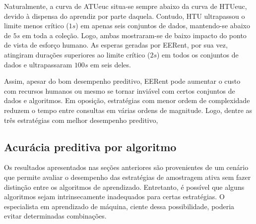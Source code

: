 Naturalmente, a curva de ATUeuc situa-se sempre abaixo da curva de HTUeuc, devido à dispensa do aprendiz por parte daquela.
Contudo, HTU ultrapassou o limite menos crítico ($1s$) em apenas seis conjuntos de dados, mantendo-se abaixo de $5s$ em toda a coleção.
Logo, ambas mostraram-se de baixo impacto do ponto de vista de esforço humano.
As esperas geradas por EERent, por sua vez, atingiram durações superiores ao limite crítico ($2s$) em todos os conjuntos de dados e ultrapassaram $100s$ em seis deles.

Assim, apesar do bom desempenho preditivo, EERent pode aumentar o custo com recursos humanos ou mesmo se tornar inviável com certos conjuntos de dados e algoritmos.
Em oposição, estratégias com menor ordem de complexidade reduzem o tempo entre consultas em várias ordens de magnitude.
Logo, dentre as três estratégias com melhor desempenho preditivo,



\subsection{Acurácia preditiva por algoritmo}\label{poralg}

Os resultados apresentados nas seções anteriores são provenientes de um cenário que permite avaliar o desempenho das estratégias de amostragem ativa sem fazer distinção entre os algoritmos de aprendizado.
Entretanto, é possível que alguns algoritmos sejam intrinsecamente inadequados para certas estratégias.
O especialista em aprendizado de máquina, ciente dessa possibilidade, poderia evitar determinadas combinações.

